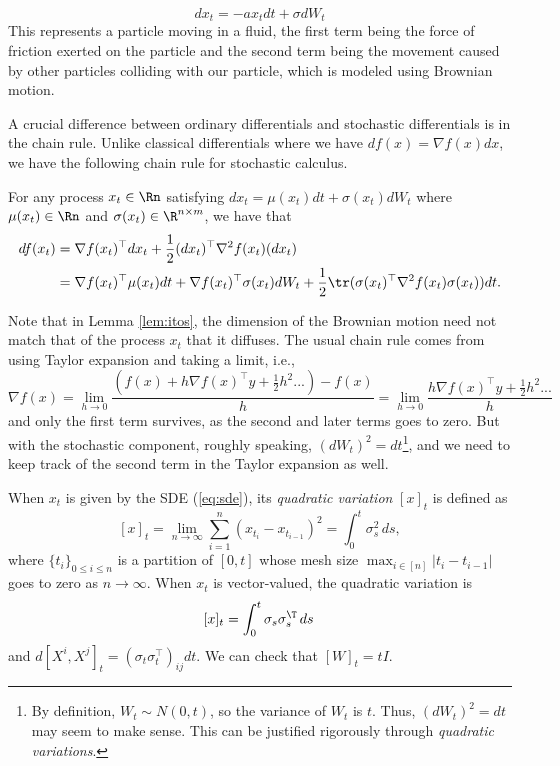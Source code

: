 \[
dx_{t}=-ax_{t}dt+\sigma dW_{t}
\]
This represents a particle moving in a fluid, the first term being
the force of friction exerted on the particle and the second term
being the movement caused by other particles colliding with our particle,
which is modeled using Brownian motion. 

A crucial difference between ordinary differentials and stochastic
differentials is in the chain rule. Unlike classical differentials
where we have $df(x)=\nabla f(x)dx$, we have the following chain
rule for stochastic calculus.
\begin{lem}[It\^{o}'s lemma]
\label{lem:itos}For any process $x_{t}\in\Rn$ satisfying $dx_{t}=\mu(x_{t})dt+\sigma(x_{t})dW_{t}$
where $\mu(x_{t})\in\Rn$ and $\sigma(x_{t})\in\R^{n\times m}$, we
have that
\begin{align*}
df(x_{t}) & =\nabla f(x_{t})^{\top}dx_{t}+\frac{1}{2}(dx_{t})^{\top}\nabla^{2}f(x_{t})(dx_{t})\\
 & =\nabla f(x_{t})^{\top}\mu(x_{t})dt+\nabla f(x_{t})^{\top}\sigma(x_{t})dW_{t}+\frac{1}{2}\tr(\sigma(x_{t})^{\top}\nabla^{2}f(x_{t})\sigma(x_{t}))dt.
\end{align*}
\end{lem}

Note that in Lemma \ref{lem:itos}, the dimension of the Brownian
motion need not match that of the process $x_{t}$ that it diffuses.
The usual chain rule comes from using Taylor expansion and taking
a limit, i.e., 
\[
\nabla f(x)=\lim_{h\rightarrow0}\frac{(f(x)+h\nabla f(x)^{\top}y+\frac{1}{2}h^{2}...)-f(x)}{h}=\lim_{h\rightarrow0}\frac{h\nabla f(x)^{\top}y+\frac{1}{2}h^{2}...}{h}
\]
and only the first term survives, as the second and later terms goes
to zero. But with the stochastic component, roughly speaking, $(dW_{t})^{2}=dt$\footnote{By definition, $W_{t}\sim N(0,t)$, so the variance of $W_{t}$ is
$t$. Thus, $(dW_{t})^{2}=dt$ may seem to make sense. This can be
justified rigorously through \emph{quadratic variations}.}, and we need to keep track of the second term in the Taylor expansion
as well. 

When $x_{t}$ is given by the SDE (\ref{eq:sde}), its \emph{quadratic
variation} $[x]_{t}$ is defined as
\[
[x]_{t}=\lim_{n\to\infty}\sum_{i=1}^{n}(x_{t_{i}}-x_{t_{i-1}})^{2}=\int_{0}^{t}\sigma_{s}^{2}\,ds,
\]
where $\{t_{i}\}_{0\leq i\leq n}$ is a partition of $[0,t]$ whose
mesh size $\max_{i\in[n]}|t_{i}-t_{i-1}|$ goes to zero as $n\to\infty$.
When $x_{t}$ is vector-valued, the quadratic variation is 
\[
[x]_{t}=\int_{0}^{t}\sigma_{s}\sigma_{s}^{\T}\,ds\,
\]
and $d[X^{i},X^{j}]_{t}=(\sigma_{t}\sigma_{t}^{\top})_{ij}dt$. We
can check that $[W]_{t}=tI$.

